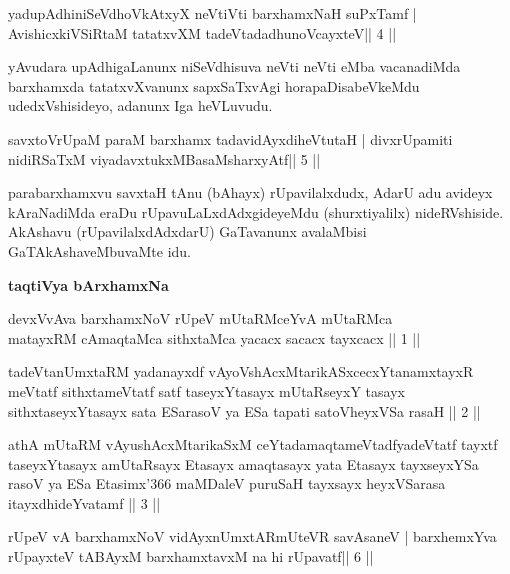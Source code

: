 \begin{shl}
yadupAdhiniSeVdhoVkAtxyX neVtiVti barxhamxNaH suPxTamf |
AvishicxkiVSiRtaM tatatxvXM tadeVtadadhunoVcayxteV\hfill || 4 ||
\end{shl}

\begin{artha}
yAvudara upAdhigaLanunx niSeVdhisuva neVti neVti eMba vacanadiMda barxhamxda tatatxvXvanunx sapxSaTxvAgi horapaDisabeVkeMdu udedxVshisideyo, adanunx Iga heVLuvudu.
\end{artha}



\begin{shl}
savxtoV\s rUpaM paraM barxhamx tadavidAyxdiheVtutaH |
divxrUpamiti nidiRSaTxM viyadavxtukxMBasaMsharxyAtf\hfill || 5 ||
\end{shl}

\begin{artha}
parabarxhamxvu savxtaH tAnu (bAhayx) rUpavilalxdudx, AdarU adu avideyx kAraNadiMda eraDu rUpavuLaLxdAdxgideyeMdu (shurxtiyalilx)  nideRVshiside. AkAshavu (rUpavilalxdAdxdarU) GaTavanunx avalaMbisi GaTAkAshaveMbuvaMte idu.
\end{artha}



{\centerline{\textbf{taqtiVya bArxhamxNa}}}
\medskip
{}

\begin{kandikeshl}
devxVvAva barxhamxNoV rUpeV mUtaRMceYvA mUtaRMca\\
matayxRM cAmaqtaMca sithxtaMca yacacx sacacx tayxcacx || 1 ||

tadeVtanUmxtaRM yadanayxdf vAyoVshAcxMtarikASxcecxYtanamxtayxR
meVtatf sithxtameVtatf satf taseyxYtasayx mUtaRseyxY tasayx
sithxtaseyxYtasayx sata ESarasoV ya ESa tapati satoVheyxVSa rasaH || 2 || 

athA mUtaRM vAyushAcxMtarikaSxM ceYtadamaqtameVtadfyadeVtatf tayxtf
taseyxYtasayx amUtaRsayx Etasayx amaqtasayx yata Etasayx tayxseyxYSa
rasoV ya ESa Etasimx\char'366 maMDaleV puruSaH tayxsayx heyxVSarasa
itayxdhideYvatamf || 3 ||
\end{kandikeshl}


\begin{shl}
rUpeV vA barxhamxNoV vidAyxnUmxtARmUteVR savAsaneV |
barxhemxYva rUpayxteV tABAyxM barxhamxtavxM na hi rUpavatf\hfill || 6 ||
\end{shl}

